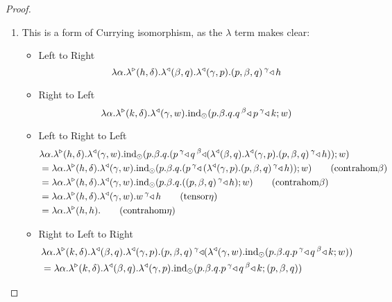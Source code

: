 \documentclass{llncs}
\begin{document}
\begin{proof}
  \begin{enumerate}
  \item This is a form of Currying isomorphism, as the $\lambda$ term
    makes clear:
    \begin{itemize}
    \item Left to Right
      \[ \lambdaunary \alpha h \delta \homllambdaXatYdotZ q \beta \homllambdaXatYdotZ p \gamma \homlappXtoYatZ h {(p,\beta,q)} \gamma  \]
    \item Right to Left
      \[ \lambdaunary {\alpha} k \delta \homllambdaXatYdotZ w \gamma \tensorelimWkontZ {w} {p.\beta.q. \homlappXtoYatZ {\homlappXtoYatZ k p \gamma} q \beta } \]
    \item Left to Right to Left
      \begin{align*}
        &\lambdaunary \alpha h \delta \homllambdaXatYdotZ w \gamma {\tensorelimWkontZ {w} {p.\beta.q. (\homlappXtoYatZ {\homlappXtoYatZ {(\homllambdaXatYdotZ q \beta \homllambdaXatYdotZ p \gamma {\homlappXtoYatZ h {(p,\beta,q)} \gamma})} q \beta }  p \gamma) }}\\
        &=\lambdaunary \alpha h \delta \homllambdaXatYdotZ w \gamma {\tensorelimWkontZ {w} {p.\beta.q. (\homlappXtoYatZ {{(\homllambdaXatYdotZ p \gamma {\homlappXtoYatZ h {(p,\beta,q)} \gamma})} }  p \gamma) }}\tag{contrahom$\beta$}\\
        &=\lambdaunary \alpha h \delta \homllambdaXatYdotZ w \gamma {\tensorelimWkontZ {w} {p.\beta.q. {{({\homlappXtoYatZ h {(p,\beta,q)} \gamma})} } }}\tag{contrahom$\beta$}\\
        &=\lambdaunary \alpha h \delta \homllambdaXatYdotZ w \gamma \homlappXtoYatZ h w \gamma\tag{tensor$\eta$}\\
        &=\lambdaunary \alpha h h\tag{contrahom$\eta$}
      \end{align*}
    \item Right to Left to Right
      \begin{align*}
        &\lambdaunary \alpha k \delta \homllambdaXatYdotZ q \beta \homllambdaXatYdotZ p \gamma \homlappXtoYatZ {(\homllambdaXatYdotZ w \gamma {\tensorelimWkontZ {w} {p.\beta.q. \homlappXtoYatZ {\homlappXtoYatZ k q \beta}  p \gamma }})} {(p,\beta,q)} \gamma\\
        &=\lambdaunary \alpha k \delta \homllambdaXatYdotZ q \beta \homllambdaXatYdotZ p \gamma { {\tensorelimWkontZ { {(p,\beta,q)}} {p.\beta.q. \homlappXtoYatZ {\homlappXtoYatZ k q \beta } p \gamma }}}\\

\end{align*}
\end{itemize}
\end{enumerate}
\end{proof}
\end{document}
